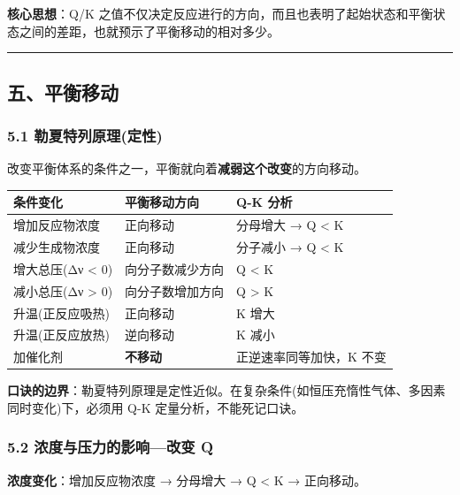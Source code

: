 \documentclass[a4paper,11pt]{ctexart}
\newcounter{none}
\begin{document}
\textbf{核心思想}：Q/K 之值不仅决定反应进行的方向，而且也表明了起始状态和平衡状态之间的差距，也就预示了平衡移动的相对多少。

\begin{center}\rule{0.5\linewidth}{0.5pt}\end{center}

\subsection{五、平衡移动}\label{ux4e94ux5e73ux8861ux79fbux52a8}

\subsubsection{5.1 勒夏特列原理(定性)}\label{ux52d2ux590fux7279ux5217ux539fux7406ux5b9aux6027}

改变平衡体系的条件之一，平衡就向着\textbf{减弱这个改变}的方向移动。

{\def\LTcaptype{none} %
\begin{longtable}[]{@{}lll@{}}
\toprule\noalign{}
条件变化 & 平衡移动方向 & Q-K 分析 \\
\midrule\noalign{}
\endhead
\bottomrule\noalign{}
\endlastfoot
增加反应物浓度 & 正向移动 & 分母增大 → Q \textless{} K \\
减少生成物浓度 & 正向移动 & 分子减小 → Q \textless{} K \\
增大总压(Δν \textless{} 0) & 向分子数减少方向 & Q \textless{} K \\
减小总压(Δν \textgreater{} 0) & 向分子数增加方向 & Q \textgreater{} K \\
升温(正反应吸热) & 正向移动 & K 增大 \\
升温(正反应放热) & 逆向移动 & K 减小 \\
加催化剂 & \textbf{不移动} & 正逆速率同等加快，K 不变 \\
\end{longtable}
}

\textbf{口诀的边界}：勒夏特列原理是定性近似。在复杂条件(如恒压充惰性气体、多因素同时变化)下，必须用 Q-K 定量分析，不能死记口诀。

\subsubsection{5.2 浓度与压力的影响---改变 Q}\label{ux6d53ux5ea6ux4e0eux538bux529bux7684ux5f71ux54cdux6539ux53d8-q}

\textbf{浓度变化}：增加反应物浓度 → 分母增大 → Q \textless{} K → 正向移动。
\end{document}
